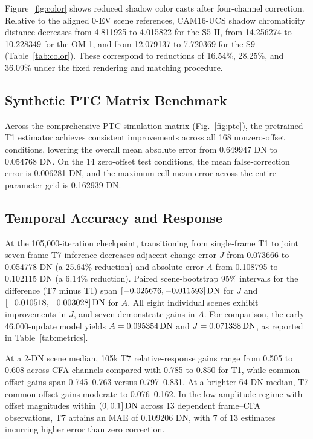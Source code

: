 Figure~\ref{fig:color} shows reduced shadow color casts after four-channel correction. Relative to the aligned 0-EV scene references, CAM16-UCS shadow chromaticity distance decreases from 4.811925 to 4.015822 for the S5 II, from 14.256274 to 10.228349 for the OM-1, and from 12.079137 to 7.720369 for the S9 (Table~\ref{tab:color}). These correspond to reductions of 16.54\%, 28.25\%, and 36.09\% under the fixed rendering and matching procedure.



\subsection{Synthetic PTC Matrix Benchmark}
Across the comprehensive PTC simulation matrix (Fig.~\ref{fig:ptc}), the pretrained T1 estimator achieves consistent improvements across all 168 nonzero-offset conditions, lowering the overall mean absolute error from 0.649947 DN to 0.054768 DN. On the 14 zero-offset test conditions, the mean false-correction error is 0.006281 DN, and the maximum cell-mean error across the entire parameter grid is 0.162939 DN.


\subsection{Temporal Accuracy and Response}


At the 105,000-iteration checkpoint, transitioning from single-frame T1 to joint seven-frame T7 inference decreases adjacent-change error $J$ from 0.073666 to 0.054778 DN (a 25.64\% reduction) and absolute error $A$ from 0.108795 to 0.102115 DN (a 6.14\% reduction). Paired scene-bootstrap 95\% intervals for the difference (T7 minus T1) span $[-0.025676,-0.011593]\,\mathrm{DN}$ for $J$ and $[-0.010518,-0.003028]\,\mathrm{DN}$ for $A$. All eight individual scenes exhibit improvements in $J$, and seven demonstrate gains in $A$. For comparison, the early 46,000-update model yields $A=0.095354\,\mathrm{DN}$ and $J=0.071338\,\mathrm{DN}$, as reported in Table~\ref{tab:metrics}.

At a 2-DN scene median, 105k T7 relative-response gains range from 0.505 to 0.608 across CFA channels compared with 0.785 to 0.850 for T1, while common-offset gains span 0.745--0.763 versus 0.797--0.831. At a brighter 64-DN median, T7 common-offset gains moderate to 0.076--0.162. In the low-amplitude regime with offset magnitudes within $(0,0.1]\,\mathrm{DN}$ across 13 dependent frame--CFA observations, T7 attains an MAE of 0.109206 DN, with 7 of 13 estimates incurring higher error than zero correction.



